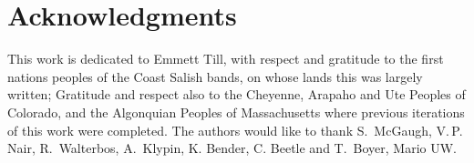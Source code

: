 \documentclass[reprint,%
 amsmath,amssymb,
 aps,
]{revtex4-1}
\begin{document}


   

  \section[]{Acknowledgments}
 This work is dedicated to Emmett Till, with respect and gratitude to the first nations peoples of the Coast Salish bands, 
 on whose lands this was largely  written; 
 Gratitude and respect also to 
 the Cheyenne,
 Arapaho and Ute  Peoples of Colorado, and the Algonquian Peoples of Massachusetts where previous iterations of this work were completed. 
  The authors would like to thank  S.\ McGaugh,  V.\,P.\,  Nair,   R.\, Walterbos,  A.\, Klypin, K. Bender, C. Beetle and     T.\, Boyer, Mario UW.   \\
  
\end{document}
